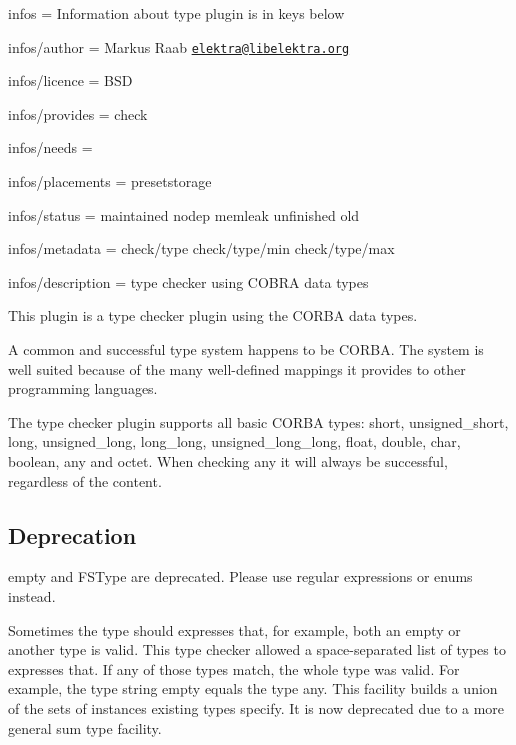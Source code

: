 
\begin{DoxyItemize}
\item infos = Information about type plugin is in keys below
\item infos/author = Markus Raab \href{mailto:elektra@libelektra.org}{\tt elektra@libelektra.\+org}
\item infos/licence = B\+SD
\item infos/provides = check
\item infos/needs =
\item infos/placements = presetstorage
\item infos/status = maintained nodep memleak unfinished old
\item infos/metadata = check/type check/type/min check/type/max
\item infos/description = type checker using C\+O\+B\+RA data types
\end{DoxyItemize}

This plugin is a type checker plugin using the {\ttfamily C\+O\+R\+BA} data types.

A common and successful type system happens to be C\+O\+R\+BA. The system is well suited because of the many well-\/defined mappings it provides to other programming languages.

The type checker plugin supports all basic C\+O\+R\+BA types\+: {\ttfamily short}, {\ttfamily unsigned\+\_\+short}, {\ttfamily long}, {\ttfamily unsigned\+\_\+long}, {\ttfamily long\+\_\+long}, {\ttfamily unsigned\+\_\+long\+\_\+long}, {\ttfamily float}, {\ttfamily double}, {\ttfamily char}, {\ttfamily boolean}, {\ttfamily any} and {\ttfamily octet}. When checking {\ttfamily any} it will always be successful, regardless of the content.

\subsection*{Deprecation}

{\ttfamily empty} and {\ttfamily F\+S\+Type} are deprecated. Please use regular expressions or enums instead.

Sometimes the type should expresses that, for example, both an empty or another type is valid. This type checker allowed a space-\/separated list of types to expresses that. If any of those types match, the whole type was valid. For example, the type {\ttfamily string empty} equals the type {\ttfamily any}. This facility builds a union of the sets of instances existing types specify. It is now deprecated due to a more general sum type facility.

